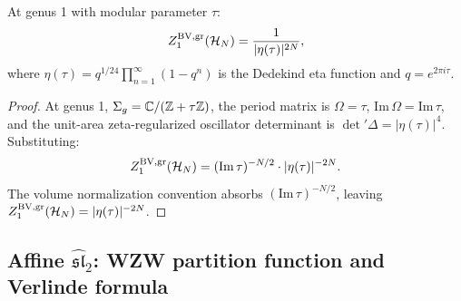 \begin{corollary}
At genus 1 with modular parameter $\tau$:
\[
Z_1^{\mathrm{BV,gr}}(\mathcal{H}_N) = \frac{1}{|\eta(\tau)|^{2N}},
\]
where $\eta(\tau) = q^{1/24} \prod_{n=1}^{\infty} (1 - q^n)$ is the
Dedekind eta function and $q = e^{2\pi i \tau}$.
\end{corollary}

\begin{proof}
At genus 1, $\Sigma_g = \mathbb{C} / (\mathbb{Z} + \tau \mathbb{Z})$, the period matrix is
$\Omega = \tau$, $\mathrm{Im}\, \Omega = \mathrm{Im}\, \tau$, and the
unit-area zeta-regularized oscillator determinant is
\(\det{}' \Delta = |\eta(\tau)|^4\). Substituting:
\[
Z_1^{\mathrm{BV,gr}}(\mathcal{H}_N)
 = (\mathrm{Im}\, \tau)^{-N/2}
 \cdot |\eta(\tau)|^{-2N}.
\]
The volume normalization convention absorbs $(\mathrm{Im}\,
\tau)^{-N/2}$, leaving
$Z_1^{\mathrm{BV,gr}}(\mathcal{H}_N) = |\eta(\tau)|^{-2N}$.
\end{proof}

\subsection{Affine $\widehat{\mathfrak{sl}}_2$: WZW partition function and Verlinde formula}

